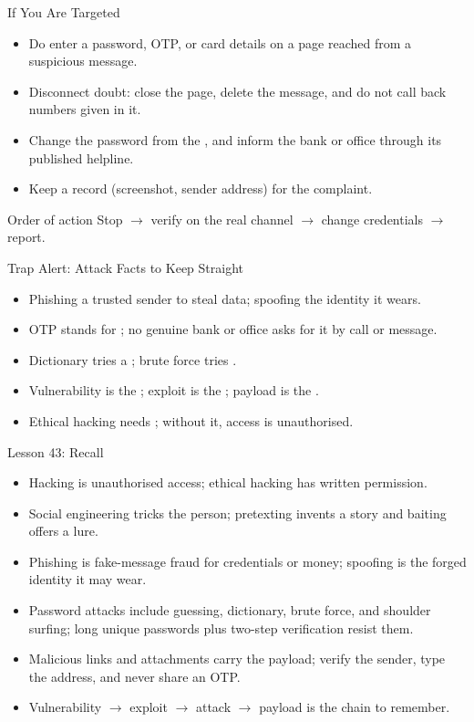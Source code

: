 \documentclass[aspectratio=169]{beamer}
\begin{document}
\begin{frame}{If You Are Targeted}
  \begin{itemize}
    \item Do  enter a password, OTP, or card details on a page
      reached from a suspicious message.
    \item Disconnect doubt: close the page, delete the message, and do
      not call back numbers given in it.
    \item Change the password from the , and inform
      the bank or office through its published helpline.
    \item Keep a record (screenshot, sender address) for the complaint.
  \end{itemize}
  \begin{alertblock}{Order of action}
    Stop $\rightarrow$ verify on the real channel $\rightarrow$ change
    credentials $\rightarrow$ report.
  \end{alertblock}
\end{frame}

\begin{frame}{Trap Alert: Attack Facts to Keep Straight}
  \begin{itemize}
    \item Phishing  a trusted sender to steal data; spoofing
       the identity it wears.
    \item OTP stands for ; no genuine bank or
      office asks for it by call or message.
    \item Dictionary tries a ; brute force tries
      .
    \item Vulnerability is the ; exploit is the
      ; payload is the .
    \item Ethical hacking needs ; without it,
      access is unauthorised.
  \end{itemize}
\end{frame}

\begin{frame}{Lesson 43: Recall}
  \begin{itemize}
    \item Hacking is unauthorised access; ethical hacking has written
      permission.
    \item Social engineering tricks the person; pretexting invents a
      story and baiting offers a lure.
    \item Phishing is fake-message fraud for credentials or money;
      spoofing is the forged identity it may wear.
    \item Password attacks include guessing, dictionary, brute force,
      and shoulder surfing; long unique passwords plus two-step
      verification resist them.
    \item Malicious links and attachments carry the payload; verify the
      sender, type the address, and never share an OTP.
    \item Vulnerability $\rightarrow$ exploit $\rightarrow$ attack
      $\rightarrow$ payload is the chain to remember.
  \end{itemize}
\end{frame}
\end{document}
